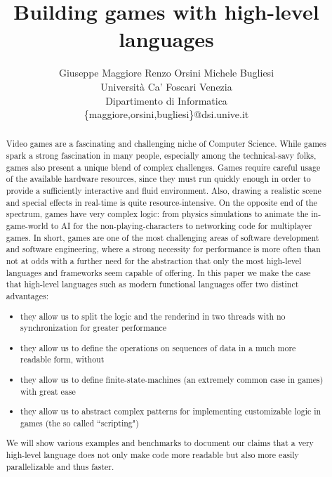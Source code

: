 \documentclass[a4paper]{article}
\begin{document}
\title{\bf Building games with high-level languages}

\author{Giuseppe Maggiore \quad
		  Renzo Orsini
		  Michele Bugliesi
 \\ Universit\`a Ca' Foscari Venezia
 \\ Dipartimento di Informatica 
 \\ \{maggiore,orsini,bugliesi\}@dsi.unive.it
}

\date{}
\maketitle

\begin{abstract}
Video games are a fascinating and challenging niche of Computer Science. While games spark a strong fascination in many people, especially among the technical-savy folks, games also present a unique blend of complex challenges. Games require careful usage of the available hardware resources, since they must run quickly enough in order to provide a sufficiently interactive and fluid environment. Also, drawing a realistic scene and special effects in real-time is quite resource-intensive. On the opposite end of the spectrum, games have very complex logic: from physics simulations to animate the in-game-world to AI for the non-playing-characters to networking code for multiplayer games. In short, games are one of the most challenging areas of software development and software engineering, where a strong necessity for performance is more often than not at odds with a further need for the abstraction that only the most high-level languages and frameworks seem capable of offering. In this paper we make the case that high-level languages such as modern functional languages offer two distinct advantages:
\begin{itemize}
\item they allow us to split the logic and the renderind in two threads with no synchronization for greater performance
\item they allow us to define the operations on sequences of data in a much more readable form, without 
\item they allow us to define finite-state-machines (an extremely common case in games) with great ease
\item they allow us to abstract complex patterns for implementing customizable logic in games (the so called ``scripting")
\end{itemize}
We will show various examples and benchmarks to document our claims that a very high-level language does not only make code more readable but also more easily parallelizable and thus faster.
\end{abstract}
\end{document}
